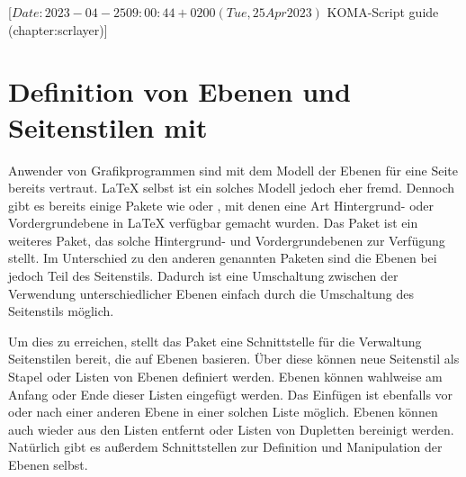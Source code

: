 %
%
%
%
%
%
%

%
                 [$Date: 2023-04-25 09:00:44 +0200 (Tue, 25 Apr 2023) $
                  KOMA-Script guide (chapter:scrlayer)]

\chapter[{Definition von Ebenen und Seitenstilen mit \Package{scrlayer}}]
  {Definition von Ebenen und Seitenstilen
    mit }

\BeginIndexGroup
{}%
%
Anwender von Grafikprogrammen sind mit dem Modell der Ebenen für eine Seite
bereits vertraut. \LaTeX{} selbst ist ein solches Modell jedoch eher
fremd. Dennoch gibt es bereits einige Pakete wie  oder
, mit denen eine Art Hintergrund- oder
Vor\-der\-grund\-ebe\-ne in \LaTeX{} verfügbar gemacht wurden. Das Paket
 ist ein weiteres Paket, das solche Hintergrund- und
Vordergrundebenen zur Verfügung stellt. Im Unterschied zu den anderen
genannten Paketen sind die Ebenen bei  jedoch Teil des
Seitenstils. Dadurch ist eine Umschaltung zwischen der Verwendung
unterschiedlicher Ebenen einfach durch die Umschaltung des Seitenstils möglich.

Um dies zu erreichen, stellt das Paket eine Schnittstelle für die Verwaltung
Seitenstilen bereit, die auf Ebenen basieren. Über diese können neue
Seitenstil als Stapel oder Listen von Ebenen definiert werden. Ebenen können
wahlweise am Anfang oder Ende dieser Listen eingefügt werden. Das Einfügen ist
ebenfalls vor oder nach einer anderen Ebene in einer solchen Liste
möglich. Ebenen können auch wieder aus den Listen entfernt oder Listen von
Dupletten bereinigt werden. Natürlich gibt es außerdem Schnittstellen zur
Definition und Manipulation der Ebenen selbst.

